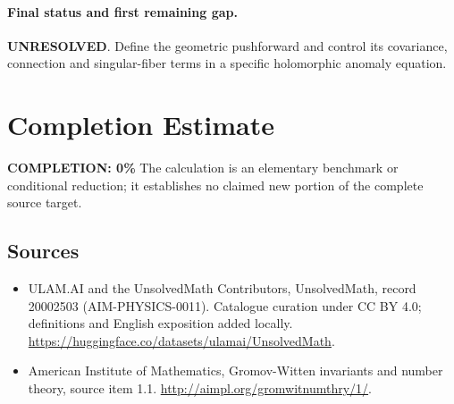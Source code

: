 \documentclass[11pt]{article}
\begin{document}
\paragraph{Final status and first remaining gap.}
\textbf{UNRESOLVED}. Define the geometric pushforward and control its covariance, connection and singular-fiber terms in a specific holomorphic anomaly equation.

\section{Completion Estimate}
\noindent\textbf{COMPLETION: 0\%}
The calculation is an elementary benchmark or conditional reduction; it establishes no claimed new portion of the complete source target.

\subsection{Sources}
\begin{itemize}
\item[\hypertarget{source:20002503:1}{S1}] ULAM.AI and the UnsolvedMath Contributors, UnsolvedMath, record 20002503 (AIM-PHYSICS-0011). Catalogue curation under CC BY 4.0; definitions and English exposition added locally.
\url{https://huggingface.co/datasets/ulamai/UnsolvedMath}.
\item[\hypertarget{source:20002503:2}{S2}] American Institute of Mathematics, Gromov-Witten invariants and number theory, source item 1.1.
\url{http://aimpl.org/gromwitnumthry/1/}.
\end{itemize}
\label{end:20002503}
\end{document}
